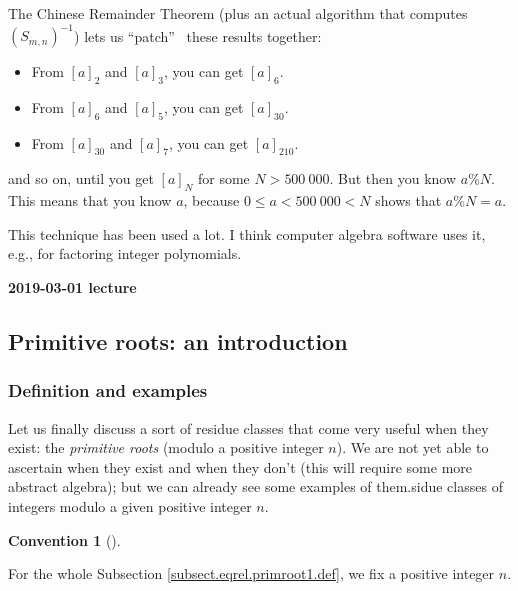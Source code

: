 \documentclass[numbers=enddot,12pt,final,onecolumn,notitlepage]{scrartcl}%
\numberwithin{exer}{subsection}
\theoremstyle{definition}
\newtheorem{conv}[theo]{Convention}
\newenvironment{convention}[1][]
{\begin{conv}[#1]\begin{leftbar}}
{\end{leftbar}\end{conv}}
\begin{document}
The Chinese Remainder Theorem (plus an actual algorithm that computes $\left(
S_{m,n}\right)  ^{-1}$) lets us \textquotedblleft patch\textquotedblright%
\ these results together:

\begin{itemize}
\item From $\left[  a\right]  _{2}$ and $\left[  a\right]  _{3}$, you can get
$\left[  a\right]  _{6}$.

\item From $\left[  a\right]  _{6}$ and $\left[  a\right]  _{5}$, you can get
$\left[  a\right]  _{30}$.

\item From $\left[  a\right]  _{30}$ and $\left[  a\right]  _{7}$, you can get
$\left[  a\right]  _{210}$.
\end{itemize}

and so on, until you get $\left[  a\right]  _{N}$ for some $N>500\ 000$. But
then you know $a\%N$. This means that you know $a$, because $0\leq
a<500\ 000<N$ shows that $a\%N=a$.

This technique has been used a lot. I think computer algebra software uses it,
e.g., for factoring integer polynomials.

\begin{center}
\textbf{2019-03-01 lecture}
\end{center}

\subsection{\label{sect.eqrel.primroot1}Primitive roots: an introduction}

\subsubsection{\label{subsect.eqrel.primroot1.def}Definition and examples}

Let us finally discuss a sort of residue classes that come very useful when
they exist: the \textit{primitive roots} (modulo a positive integer $n$). We
are not yet able to ascertain when they exist and when they don't (this will
require some more abstract algebra); but we can already see some examples of
them.sidue classes of integers modulo a given positive integer $n$.

\begin{convention}
For the whole Subsection \ref{subsect.eqrel.primroot1.def}, we fix a positive
integer $n$.
\end{convention}
\end{document}
